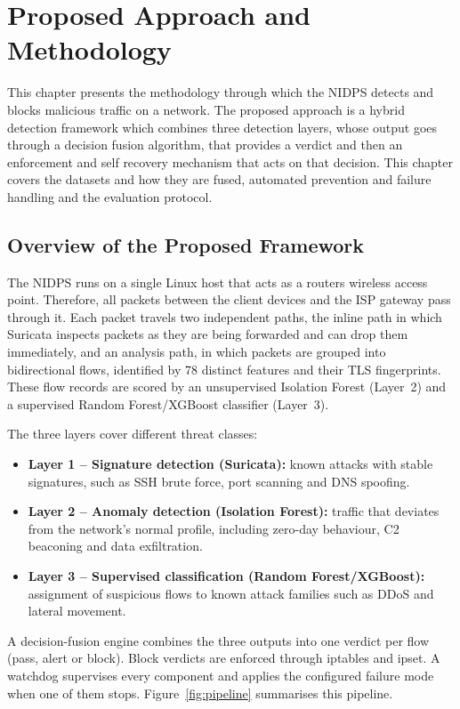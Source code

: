 \chapter{Proposed Approach and Methodology}\label{chap:5}
\label{chap:approach}
\noindent This chapter presents the methodology through which the NIDPS detects and blocks malicious traffic on a network. The proposed approach is a hybrid detection framework which combines three detection layers, whose output goes through a decision fusion algorithm, that provides a verdict and then an enforcement and self recovery mechanism that acts on that decision. This chapter covers the datasets and how they are fused, automated prevention and failure handling and the evaluation protocol.

\section{Overview of the Proposed Framework}\label{sec:5.1}
\label{sec:overview}
\noindent The NIDPS runs on a single Linux host that acts as a routers wireless access point. Therefore, all packets between the client devices and the ISP gateway pass through it. Each packet travels two independent paths, the inline path in which Suricata inspects packets as they are being forwarded and can drop them immediately, and an analysis path, in which packets are grouped into bidirectional flows, identified by 78 distinct features and their TLS fingerprints. These flow records are scored by an unsupervised Isolation Forest (Layer~2) and a supervised Random Forest/XGBoost classifier (Layer~3).

\noindent The three layers cover different threat classes:
\begin{itemize}
    \item \textbf{Layer 1 -- Signature detection (Suricata):} known attacks with stable signatures, such as SSH brute force, port scanning and DNS spoofing.
    \item \textbf{Layer 2 -- Anomaly detection (Isolation Forest):} traffic that deviates from the network's normal profile, including zero-day behaviour, C2 beaconing and data exfiltration.
    \item \textbf{Layer 3 -- Supervised classification (Random Forest/XGBoost):} assignment of suspicious flows to known attack families such as DDoS and lateral movement.
\end{itemize}

\noindent A decision-fusion engine combines the three outputs into one verdict per flow (pass, alert or block). Block verdicts are enforced through iptables and ipset. A watchdog supervises every component and applies the configured failure mode when one of them stops. Figure~\ref{fig:pipeline} summarises this pipeline.

